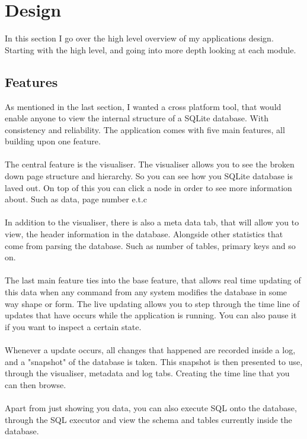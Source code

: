 \section{Design}
\label{sec:design}

In this section I go over the high level overview of my applications design. Starting with the high level, and going into more depth looking at each module.

\subsection{Features}
\label{subsec:Features}
As mentioned in the last section, I wanted a cross platform tool, that would enable anyone to view the internal structure of a SQLite database. With consistency and reliability. The application comes with five main features, all building upon one feature.  
\\\\
The central feature is the visualiser. The visualiser allows you to see the broken down page structure and hierarchy. So you can see how you SQLite database is laved out. On top of this you can click a node in order to see more information about. Such as data, page number e.t.c
\\\\
In addition to the visualiser, there is also a meta data tab, that will allow you to view, the header information in the database. Alongside other statistics that come from parsing the database. Such as number of tables, primary keys and so on.
\\\\
The last main feature ties into the base feature, that allows real time updating of this data when any command from any system modifies the database in some way shape or form. The live updating allows you to step through the time line of updates that have occurs while the application is running. You can also pause it if you want to inspect a certain state. 
\\\\
Whenever a update occurs, all changes that happened are recorded inside a log, and a "snapshot" of the database is taken. This snapshot is then presented to use, through the visualiser, metadata and log tabs. Creating the time line that you can then browse. 
\\\\
Apart from just showing you data, you can also execute SQL onto the database, through the SQL executor and view the schema and tables currently inside the database.

